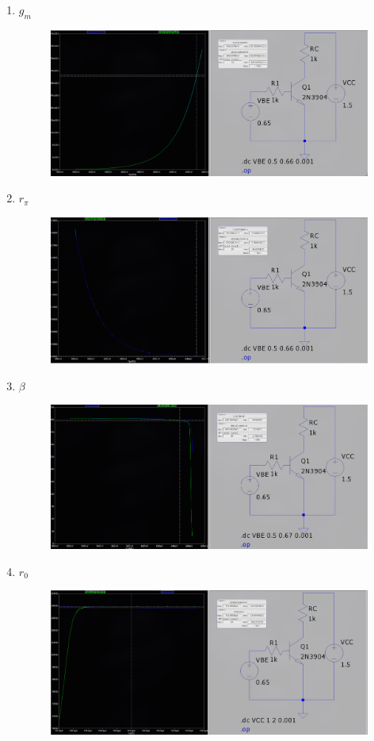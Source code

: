 \documentclass{article}
\begin{document}
\begin{enumerate}
    \item $g_m$ \begin{figure}[h!]
        \centering
        \includegraphics[width=0.9\linewidth]{figs/bjt_gm_new.png}
    \end{figure}
    \item $r_{\pi}$ \begin{figure}[h!]
        \centering
        \includegraphics[width=0.9\linewidth]{figs/bjt_rpi_new.png}
    \end{figure}
    \item $\beta$ \begin{figure}[h!]
        \centering
        \includegraphics[width=0.9\linewidth]{figs/bjt_beta_new.png}
    \end{figure}
    \pagebreak
    \item $r_0$ \begin{figure}[h!]
        \centering
        \includegraphics[width=0.9\linewidth]{figs/bjt_r0_new.png}
    \end{figure}
\end{enumerate}
\end{document}
